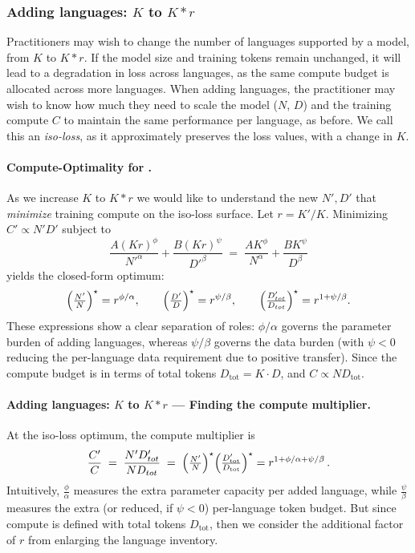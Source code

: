 \subsubsection{Adding languages: $K$ to $K*r$}

Practitioners may wish to change the number of languages supported by a model, from $K$ to $K*r$.
If the model size and training tokens remain unchanged, it will lead to a degradation in loss across languages, as the same compute budget is allocated across more languages.
When adding languages, the practitioner may wish to know how much they need to scale the model ($N$, $D$) and the training compute $C$ to maintain the same performance per language, as before.
We call this an \emph{iso-loss}, as it approximately preserves the loss values, with a change in $K$.


\paragraph{Compute-Optimality for .}
As we increase $K$ to $K*r$ we would like to understand the new $N',D'$ that \emph{minimize} training compute on the iso-loss surface.
Let $r = K'/K$.
Minimizing $C' \propto N' D'$ subject to
\[
\frac{A (K r)^{\phi}}{N'^{\alpha}} + \frac{B (K r)^{\psi}}{D'^{\beta}}
\;=\;
\frac{A K^{\phi}}{N^{\alpha}} + \frac{B K^{\psi}}{D^{\beta}}
\]
yields the closed-form optimum:
\[
\Bigl(\tfrac{N'}{N}\Bigr)^\star = r^{\phi/\alpha},
\qquad
\Bigl(\tfrac{D'}{D}\Bigr)^\star = r^{\psi/\beta},
\qquad
\Bigl(\tfrac{D_{tot}'}{D_{tot}}\Bigr)^\star = r^{1+\psi/\beta}.
\]
These expressions show a clear separation of roles: $\phi/\alpha$ governs the parameter burden of adding languages, whereas $\psi/\beta$ governs the data burden (with $\psi<0$ reducing the per-language data requirement due to positive transfer).
Since the compute budget is in terms of total tokens $D_{\mathrm{tot}} = K\cdot D$, and $C \propto N D_{\mathrm{tot}}$.

\paragraph{Adding languages: $K$ to $K*r$ --- Finding the compute multiplier.}
At the iso-loss optimum, the compute multiplier is
\[
\frac{C'}{C}
\;=\;
\frac{N' D_{tot}'}{N D_{tot}}
\;=\;
\Bigl(\tfrac{N'}{N}\Bigr)^\star
\Bigl(\tfrac{D'_{\mathrm{tot}}}{D_{\mathrm{tot}}}\Bigr)^\star = r^{1+\phi/\alpha+\psi/\beta}\,.
\]
Intuitively, $\tfrac{\phi}{\alpha}$ measures the extra parameter capacity per added language, while $\tfrac{\psi}{\beta}$ measures the extra (or reduced, if $\psi<0$) per-language token budget.
But since compute is defined with total tokens $D_{\mathrm{tot}}$, then we consider the additional factor of $r$ from enlarging the language inventory.


